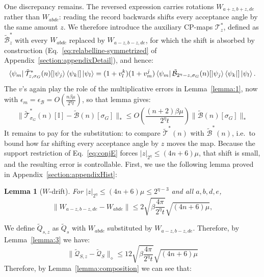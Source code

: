\documentclass[aps,floatfix,10pt,amssymb,amsfont,amsmath,superscriptaddress,float,nofootinbib,longbibliography,nobalancelastpage,twocolumn]{revtex4-2}
\newtheorem{lemma}{Lemma}
\begin{document}
\begin{widetext}
One discrepancy remains. The reversed expression carries rotations $W_{a+z,b+z,de}$ rather than $W_{abde}$: reading the record backwards shifts every acceptance angle by the same amount $z$. We therefore introduce the auxiliary CP-maps $\mathcal{T}^*_z$, defined as $\tilde{\mathcal B}^*_z$ with every $W_{abde}$ replaced by $W_{a-z,b-z,de}$, for which the shift is absorbed by construction (Eq.~\eqref{eq:relabelline-symmetrized} of Appendix~\ref{section:appendixDetail}), and hence:
\begin{equation}
    \bra{\psi_m}\tilde{\mathcal{T}}^*_{z,\sigma_G}(n)[\ket{\psi_j}\bra{\psi_k}]\ket{\psi_l}
    =(1+v_l^k)(1+v_m^j)\bra{\psi_m}\tilde{\mathcal{B}}_{2^{\eta}-z,\sigma_G}(n)[\ket{\psi_j}\bra{\psi_k}]\ket{\psi_l}.
\end{equation}
The $v$'s again play the role of the multiplicative errors in Lemma~\ref{lemma:1}, now with $\epsilon_m = \epsilon_{\mathcal{B}} = O(\frac{n\beta \mu}{2^{\eta}t})$, so that lemma gives:
\begin{equation}
    \|\tilde{\mathcal{T}}^*_{\sigma_G}(n)[\mathbb{I}] - \tilde{\mathcal{B}}(n)[\sigma_G]\|_* \leq O\left(\frac{(n+2)\beta \mu}{2^{\eta}t}\right)\|\tilde{\mathcal{B}}(n)[\sigma_G]\|_*
    \label{eq:Boutput}
\end{equation}
It remains to pay for the substitution: to compare $\tilde{\mathcal{T}}^*(n)$ with $\tilde{\mathcal{B}}^*(n)$, i.e.\ to bound how far shifting every acceptance angle by $z$ moves the map. Because the support restriction of Eq.~\eqref{eq:conjE} forces $|z|_{2^{\eta}} \leq (4n+6)\mu$, that shift is small, and the resulting error is controllable. First, we use the following lemma proved in Appendix~\ref{section:appendixHist}:
\begin{lemma}[$W$-drift]
\label{lemma:wdrift}
For $|z|_{2^{\eta}} \leq (4n+6)\mu \leq 2^{\eta-3}$ and all $a,b,d,e$,
\begin{equation}
    \|W_{a-z,b-z,de} - W_{abde}\| \leq 2\sqrt{\beta\frac{4\pi}{2^{\eta}t}}\sqrt{(4n+6)\mu},
\end{equation}
\end{lemma}
We define $\tilde Q_{s,z}$ as $\tilde Q_s$ with $W_{abde}$ substituted by $W_{a-z,b-z,de}$. Therefore, by Lemma~\ref{lemma:3} we have:
\begin{equation}
    \|\tilde{\mathcal{Q}}_{S,z} - \tilde{\mathcal{Q}}_S\|_{\diamond} \leq 12\sqrt{\beta\frac{4\pi}{2^{\eta}t}}\sqrt{(4n+6)\mu}
\end{equation}
Therefore, by Lemma~\ref{lemma:composition} we can see that:
\begin{equation}

\end{equation}
\end{widetext}
\end{document}
